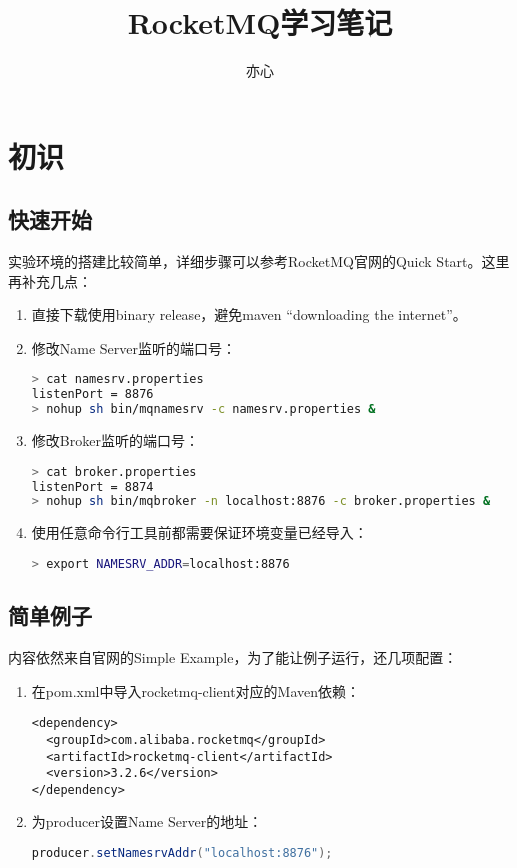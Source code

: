\documentclass[UTF8]{ctexart}
\title{RocketMQ学习笔记}
\author{亦心}
\begin{document}
\maketitle

\newpage
\tableofcontents
\newpage


\section{初识}
\subsection{快速开始}

实验环境的搭建比较简单，详细步骤可以参考RocketMQ官网的Quick Start\cite{quick-start}。这里再补充几点：

\begin{enumerate}[itemindent=1em]
\item 直接下载使用binary release，避免maven “downloading the internet”。

\item 修改Name Server监听的端口号：
\begin{lstlisting}[language=sh]
> cat namesrv.properties
listenPort = 8876
> nohup sh bin/mqnamesrv -c namesrv.properties &
\end{lstlisting}
\item 修改Broker监听的端口号：
\begin{lstlisting}[language=sh]
> cat broker.properties
listenPort = 8874
> nohup sh bin/mqbroker -n localhost:8876 -c broker.properties &
\end{lstlisting}

\item 使用任意命令行工具前都需要保证环境变量已经导入：
\begin{lstlisting}[language=sh]
> export NAMESRV_ADDR=localhost:8876
\end{lstlisting}

\end{enumerate} 



\subsection{简单例子}
内容依然来自官网的Simple Example\cite{simple-example}，为了能让例子运行，还几项配置：

\begin{enumerate}[itemindent=1em]

\item 在pom.xml中导入rocketmq-client对应的Maven依赖：
\begin{lstlisting}
<dependency>
  <groupId>com.alibaba.rocketmq</groupId>
  <artifactId>rocketmq-client</artifactId>
  <version>3.2.6</version>
</dependency>
\end{lstlisting}


\item 为producer设置Name Server的地址：
\begin{lstlisting}[language=Java]
producer.setNamesrvAddr("localhost:8876");
\end{lstlisting}

\end{enumerate} 
\end{document}
